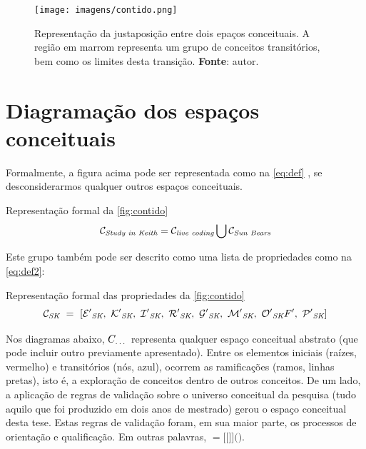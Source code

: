 {\begin{figure}[!h]
  \centering
  \texttt{[image: imagens/contido.png]}
  \caption{Representação da justaposição  entre dois epaços conceituais. A região em marrom representa um grupo de conceitos transitórios, bem como os limites desta transição. \textbf{Fonte}: autor. }
  \label{fig:contido}
\end{figure}

\section{Diagramação dos espaços conceituais}\label{sec:diagrama}

\newcommand{\csfeq}[2]{
\mathcal{#1}_\emph{#2}
}

\newcommand{\unionspaces}[6]{
\csfeq{#1}{#2} = \csfeq{#3}{#4} \bigcup \csfeq{#5}{#6}
}

\newcommand{\listspaces}[9]{
\csfeq{#1}{#2}~=~[\csfeq{#3}{#2},~\csfeq{#4}{#2},~\csfeq{#5}{#2},~\csfeq{#6}{#2},~\csfeq{#7}{#2},~\csfeq{#8}{#2},~\csfeq{#9}{#2}
}

Formalmente, a figura acima pode ser representada como na \autoref{eq:def} , se desconsiderarmos qualquer outros espaços conceituais.

\begin{example}{Representação formal da \autoref{fig:contido}}
\begin{equation}
\unionspaces{C}{Study in Keith}{C}{live coding}{C}{Sun Bears}
\label{eq:def}
\end{equation}
\end{example}

Este grupo também pode ser descrito como uma lista de propriedades como na \autoref{eq:def2}:

\begin{example}{Representação formal das propriedades da \autoref{fig:contido}}
\begin{equation}
\listspaces{C}{SK}{E'}{K'}{I'}{R'}{G'}{M'}{O'}{F'},~\csfeq{P'}{SK}]
\label{eq:def}
\end{equation}
\end{example}
  
Nos diagramas abaixo, $C_\emph{\ldots}$ representa qualquer espaço conceitual abstrato (que pode incluir outro previamente apresentado). Entre os elementos iniciais (raízes, vermelho) e transitórios (nós, azul), ocorrem as ramificações (ramos, linhas pretas), isto é, a exploração de conceitos dentro de outros conceitos. De um lado, a aplicação de regras de validação sobre o universo conceitual da pesquisa (tudo aquilo que foi produzido em dois anos de mestrado) gerou o espaço conceitual desta tese. Estas regras de validação foram, em sua maior parte, os processos de orientação e qualificação. Em outras palavras, $=[[$$]]($$)$.

}
